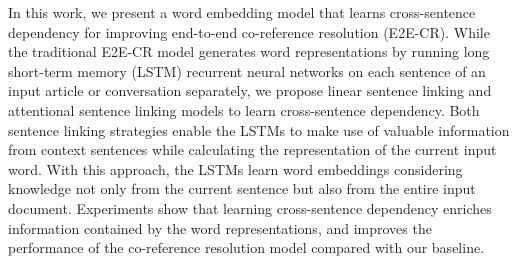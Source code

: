 In this work, we present a word embedding model that learns cross-sentence dependency for improving end-to-end co-reference resolution (E2E-CR). While the traditional E2E-CR model generates word representations by running long short-term memory (LSTM) recurrent neural networks on each sentence of an input article or conversation separately, we propose linear sentence linking and attentional sentence linking models to learn cross-sentence dependency. Both sentence linking strategies enable the LSTMs to make use of valuable information from context sentences while calculating the representation of the current input word. With this approach, the LSTMs learn word embeddings considering knowledge not only from the current sentence but also from the entire input document. Experiments show that learning cross-sentence dependency enriches information contained by the word representations, and improves the performance of the co-reference resolution model compared with our baseline.
